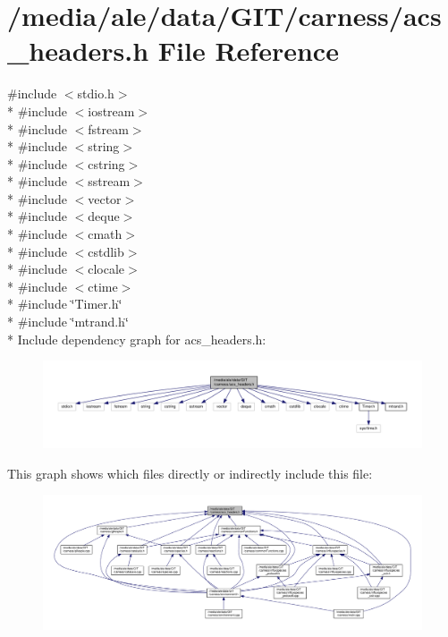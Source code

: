 \hypertarget{a00066}{\section{/media/ale/data/\-G\-I\-T/carness/acs\-\_\-headers.h File Reference}
\label{a00066}
}
{\ttfamily \#include $<$stdio.\-h$>$}\\*
{\ttfamily \#include $<$iostream$>$}\\*
{\ttfamily \#include $<$fstream$>$}\\*
{\ttfamily \#include $<$string$>$}\\*
{\ttfamily \#include $<$cstring$>$}\\*
{\ttfamily \#include $<$sstream$>$}\\*
{\ttfamily \#include $<$vector$>$}\\*
{\ttfamily \#include $<$deque$>$}\\*
{\ttfamily \#include $<$cmath$>$}\\*
{\ttfamily \#include $<$cstdlib$>$}\\*
{\ttfamily \#include $<$clocale$>$}\\*
{\ttfamily \#include $<$ctime$>$}\\*
{\ttfamily \#include \char`\"{}Timer.\-h\char`\"{}}\\*
{\ttfamily \#include \char`\"{}mtrand.\-h\char`\"{}}\\*
Include dependency graph for acs\-\_\-headers.\-h\-:\nopagebreak
\begin{figure}[H]
\begin{center}
\leavevmode
\includegraphics[width=350pt]{a00131}
\end{center}
\end{figure}
This graph shows which files directly or indirectly include this file\-:\nopagebreak
\begin{figure}[H]
\begin{center}
\leavevmode
\includegraphics[width=350pt]{a00132}
\end{center}
\end{figure}
